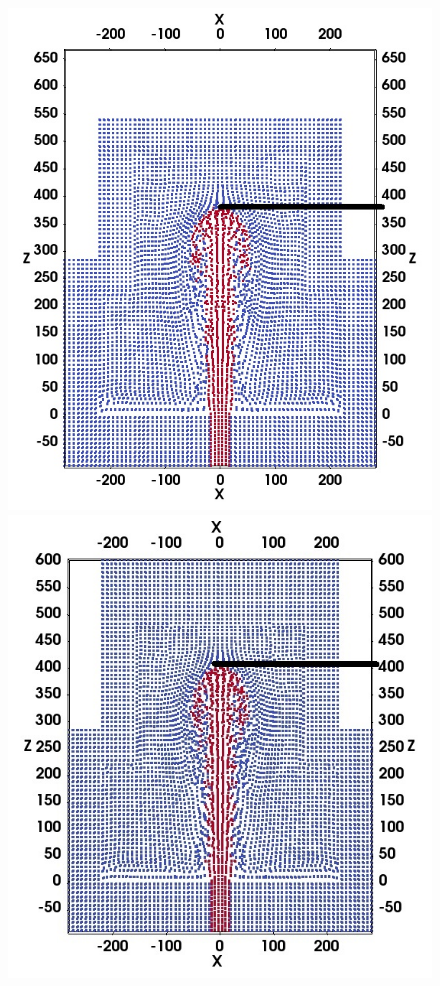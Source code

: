 \documentclass[preprint,12pt,authoryear]{elsarticle}
\begin{document}
\begin{figure}[H]
    \centering
    \begin{minipage}[t]{.325 \textwidth}
        \centering
        \includegraphics[width=0.99 \textwidth]{./Figures/GSPH-HLLC-t1p5-cutView}
    \end{minipage}%
    \begin{minipage}[t]{.325\textwidth}
        \centering
        \includegraphics[width=0.99 \textwidth]{./Figures/RSPH-t1p5-cutView}

\end{minipage}
\end{figure}
\end{document}
